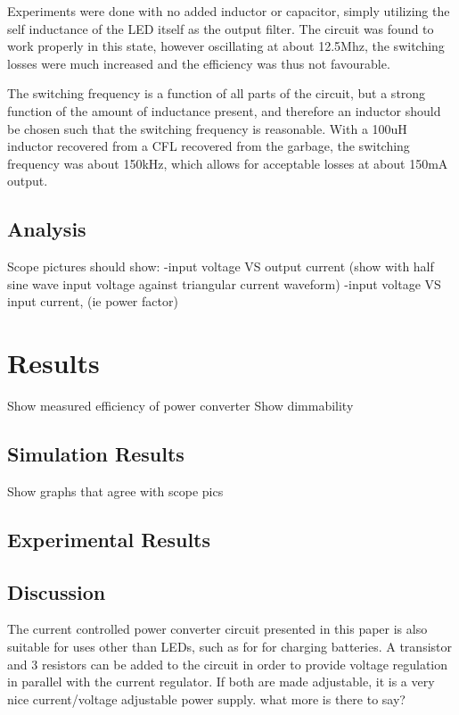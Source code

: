 \documentclass[conference]{IEEEtran}
\begin{document}
Experiments were done with no added inductor or capacitor, simply utilizing the self inductance of the LED itself as the output filter. The circuit was found to work properly in this state, however oscillating at about 12.5Mhz, the switching losses were much increased and the efficiency was thus not favourable. 

The switching frequency is a function of all parts of the circuit, but a strong function of the amount of inductance present, and therefore an inductor should be chosen such that the switching frequency is reasonable. With a 100uH inductor recovered from a CFL recovered from the garbage, the switching frequency was about 150kHz, which allows for acceptable losses at about 150mA output. 


\subsection{Analysis}
Scope pictures should show: 
-input voltage VS output current (show with half sine wave input voltage against triangular current waveform)
-input voltage VS input current, (ie power factor)

\section{Results}
Show measured efficiency of power converter
Show dimmability


\subsection{Simulation Results}
Show graphs that agree with scope pics

\subsection{Experimental Results}


\subsection{Discussion}
The current controlled power converter circuit presented in this paper is also suitable for uses other than LEDs, such as for for charging batteries. A transistor and 3 resistors can be added to the circuit in order to provide voltage regulation in parallel with the current regulator. If both are made adjustable, it is a very nice current/voltage adjustable power supply.
what more is there to say?
\end{document}
